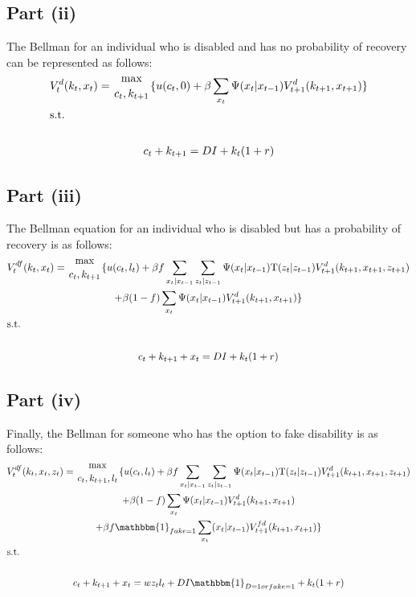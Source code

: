 \documentclass[10pt,a4paper]{article}
\begin{document}
  \subsection*{Part (ii)}
    The Bellman for an individual who is disabled and has no probability of recovery can be represented as follows:
    \begin{gather*}
      V_t^d(k_t,x_t) = {\max\atop{c_t,k_{t+1}}}\{u(c_t,0) + \beta\sum
      \limits_{x_t}\Psi(x_t|x_{t-1})V^d_{t+1}(k_{t+1},x_{t+1})\} \\
      \shortintertext{s.t.} \\
      c_t + k_{t+1} = DI + k_t(1+r)
    \end{gather*}
  \subsection*{Part (iii)}
    The Bellman equation for an individual who is disabled but has a probability of recovery is as follows:
    \begin{gather*}
      V_t^{df}(k_t,x_t) = {\max\atop{c_t,k_{t+1}}}\{u(c_t,l_t) +\beta 
      f\sum\limits_{x_t|x_{t-1}}\sum\limits_{z_t|z_{t-1}}\Psi(x_t|x_
      {t-1})\text{T}(z_t|z_{t-1})V^{d}_{t+1}(k_{t+1}, x_{t+1}, z_{t+1}) \\
      + \beta(1-f)\sum\limits_{x_t}\Psi(x_t|x_{t-1})V^d_{t+1}(k_{t+1},x_{t+1})\} \\
      \shortintertext{s.t.} \\
      c_t + k_{t+1} + x_t = DI + k_t(1+r) \\
    \end{gather*}
  \subsection*{Part (iv)}
    Finally, the Bellman for someone who has the option to fake disability is as follows:
    \begin{gather*}
      V_t^{df}(k_t,x_t,z_t) = {\max\atop{c_t,k_{t+1},l_t}}\{u(c_t,l_t) +\beta 
      f\sum\limits_{x_t|x_{t-1}}\sum\limits_{z_t|z_{t-1}}\Psi(x_t|x_
      {t-1})\text{T}(z_t|z_{t-1})V^{d}_{t+1}(k_{t+1}, x_{t+1}, z_{t+1}) \\
      + \beta(1-f)\sum\limits_{x_t}\Psi(x_t|x_{t-1})V^d_{t+1}(k_{t+1},x_{t+1}) \\
      + \beta f \mathbbm{1}_{fake = 1} \sum_{x_t}(x_t|x_{t-1})V_{t+1}^{fd}(k_{t+1},x_{t+1})\} \\
      \shortintertext{s.t.} \\
      c_t + k_{t+1} + x_t = wz_tl_t + DI\mathbbm{1}_{D = 1 or fake = 1} + k_t(1+r)
    \end{gather*}
\end{document}
